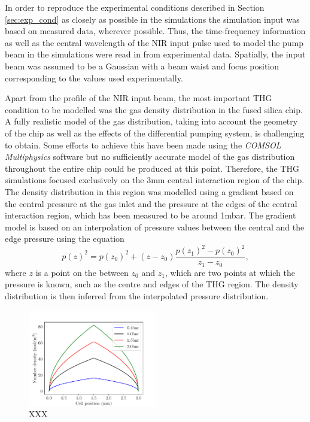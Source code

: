 \documentclass[a4paper]{jpconf}
\begin{document}
In order to reproduce the experimental conditions described in Section \ref{sec:exp_cond} as closely as possible in the simulations the simulation input was based on measured data, wherever possible. Thus, the time-frequency information as well as the central wavelength of the NIR input pulse used to model the pump beam in the simulations were read in from experimental data. Spatially, the input beam was assumed to be a Gaussian with a beam waist and focus position corresponding to the values used experimentally. \par 
Apart from the profile of the NIR input beam, the most important THG condition to be modelled was the gas density distribution in the fused silica chip. A fully realistic model of the gas distribution, taking into account the geometry of the chip as well as the effects of the differential pumping system, is challenging to obtain. Some efforts to achieve this have been made using the \textit{COMSOL Multiphysics} software but no sufficiently accurate model of the gas distribution throughout the entire chip could be produced at this point. Therefore, the THG simulations focused exclusively on the 3mm central interaction region of the chip. The density distribution in this region was modelled using a gradient based on the central pressure at the gas inlet and the pressure at the edges of the central interaction region, which has been measured to be around 1mbar. The gradient model is based on an interpolation of pressure values between the central and the edge pressure using the equation 
\begin{equation}
p(z)^2 = p(z_0)^2 + (z-z_0) \frac{p(z_1)^2 - p(z_0)^2}{z_1 - z_0}, 
\end{equation}
where $z$ is a point on the between $z_0$ and $z_1$, which are two points at which the pressure is known, such as the centre and edges of the THG region. The density distribution is then inferred from the interpolated pressure distribution.
\begin{figure}[h]
\centering
\includegraphics[width=0.5\textwidth]{im/grad_model}
\caption{XXX}\label{im:grad}
\end{figure}
\end{document}
